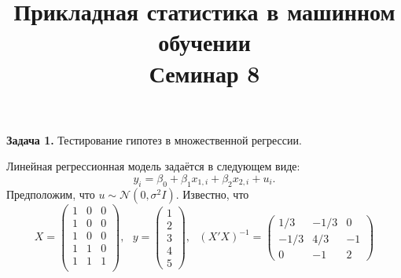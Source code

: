 \documentclass[10pt, a4paper]{extarticle}
\title{{\normalsize Прикладная статистика в машинном обучении} \\ \vspace{0.5em} Семинар 8}
\author{\rule{15cm}{0.4pt}}
\begin{document}
	
	\maketitle

	{\Large \textbf{Задача 1.} Тестирование гипотез в множественной регрессии.}
	
	Линейная регрессионная модель задаётся в следующем виде:
	\[
	y_i = \beta_0 + \beta_1x_{1, i} + \beta_2x_{2, i} + u_i.
	\] 
	Предположим, что $u \sim \mathcal{N}(0, \sigma^2I)$. Известно, что
	\[
	X = \begin{pmatrix}
		1 & 0 & 0 \\
		1 & 0 & 0 \\
		1 & 0 & 0 \\
		1 & 1 & 0 \\
		1 & 1 & 1 \\
	\end{pmatrix},\text{  }
	y = \begin{pmatrix}
		1 \\
		2 \\
		3 \\
		4 \\
		5
	\end{pmatrix}, \text{ }
	(X'X)^{-1} = \begin{pmatrix}
		1/3 & -1/3 & 0 \\
		-1/3 & 4/3 & -1 \\
		0 & -1 & 2
	\end{pmatrix}
	\]
	
\end{document}
